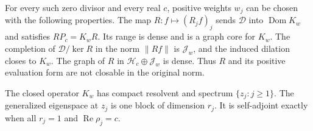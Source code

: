 \begin{theorem}
\label{v4-arith:mo:all-jets}
For every such zero divisor and every real $c$, positive weights
$w_j$ can be chosen with the following properties. The map
$R:f\mapsto(R_jf)_j$ sends $\mathscr D$ into
$\operatorname{Dom}K_w$ and satisfies $RP_c=K_wR$.
Its range is dense and is a graph core for $K_w$.
The completion of $\mathscr D/\ker R$ in the norm $\|Rf\|$
is $\mathscr J_w$, and the induced dilation closes to $K_w$.
The graph of $R$ in $\mathscr H_c\oplus\mathscr J_w$ is dense.
Thus $R$ and its positive evaluation form are not closable in
the original norm.

The closed operator $K_w$ has compact resolvent and spectrum
$\{z_j:j\geq1\}$. The generalized eigenspace at $z_j$ is one
block of dimension $r_j$. It is self-adjoint exactly when all
$r_j=1$ and $\operatorname{Re}\rho_j=c$.
\end{theorem}
